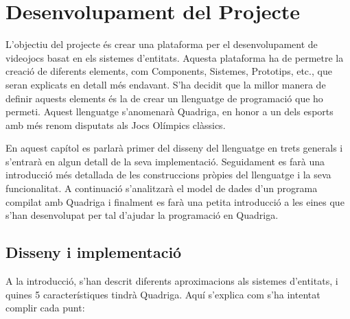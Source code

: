 \chapter{Desenvolupament del Projecte}

L'objectiu del projecte és crear una plataforma per el desenvolupament de videojocs basat en els sistemes d'entitats. Aquesta plataforma ha de permetre la creació de diferents elements, com Components, Sistemes, Prototips, etc., que seran explicats en detall més endavant.
S'ha decidit que la millor manera de definir aquests elements és la de crear un llenguatge de programació que ho permeti. Aquest llenguatge s'anomenarà Quadriga, en honor a un dels esports amb més renom disputats als Jocs Olímpics clàssics.

En aquest capítol es parlarà primer del disseny del llenguatge en trets generals i s'entrarà en algun detall de la seva implementació. Seguidament es farà una introducció més detallada de les construccions pròpies del llenguatge i la seva funcionalitat. A continuació s'analitzarà el model de dades d'un programa compilat amb Quadriga i finalment es farà una petita introducció a les eines que s'han desenvolupat per tal d'ajudar la programació en Quadriga.

\section{Disseny i implementació}

  A la introducció, s'han descrit diferents aproximacions als sistemes d'entitats, i quines 5 característiques tindrà Quadriga. Aquí s'explica com s'ha intentat complir cada punt:

